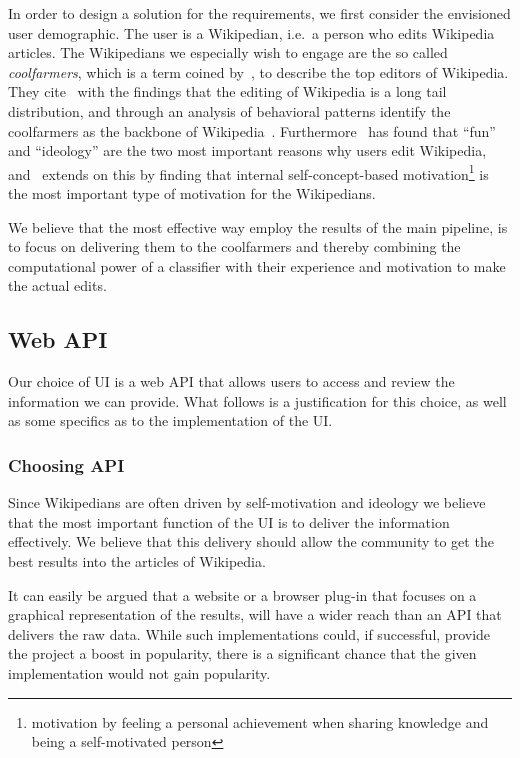 In order to design a solution for the requirements, we first consider the envisioned user demographic. The user is a Wikipedian, i.e.\ a person who edits Wikipedia articles. The Wikipedians we especially wish to engage are the so called \emph{coolfarmers}, which is a term coined by~\cite{coolfarming}, to describe the top editors of Wikipedia. They cite~\cite{Priedhorsky:2007:CDR:1316624.1316663} with the findings that the editing of Wikipedia is a long tail distribution, and through an analysis of behavioral patterns identify the coolfarmers as the backbone of Wikipedia~\cite{coolfarming}. Furthermore~\cite{wiki_motivation} has found that \enquote{fun} and \enquote{ideology} are the two most important reasons why users edit Wikipedia, and~\cite{Yang20101377} extends on this by finding that internal self-concept-based motivation\footnote{motivation by feeling a personal achievement when sharing knowledge and being a self-motivated person} is the most important type of motivation for the Wikipedians.

We believe that the most effective way employ the results of the main pipeline, is to focus on delivering them to the coolfarmers and thereby combining the computational power of a classifier with their experience and motivation to make the actual edits.


\subsection{Web API}

Our choice of UI is a web API that allows users to access and review the information we can provide. What follows is a justification for this choice, as well as some specifics as to the implementation of the UI\@.

\subsubsection{Choosing API}
Since Wikipedians are often driven by self-motivation and ideology we believe that the most important function of the UI is to deliver the information effectively. We believe that this delivery should allow the community to get the best results into the articles of Wikipedia.

It can easily be argued that a website or a browser plug-in that focuses on a graphical representation of the results, will have a wider reach than an API that delivers the raw data. While such implementations could, if successful, provide the project a boost in popularity, there is a significant chance that the given implementation would not gain popularity.

